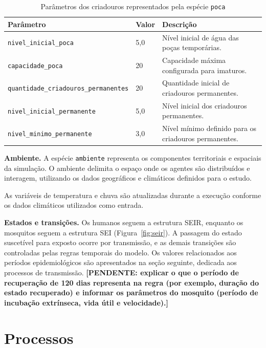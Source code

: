 \begin{table}[htb]
    \centering
    \caption{Parâmetros dos criadouros representados pela espécie \texttt{poca}}
    \label{tab:parametros-poca}
    \begin{tabular}{p{4.2cm} p{2.5cm} p{6.0cm}}
        \hline
        \textbf{Parâmetro} & \textbf{Valor} & \textbf{Descrição} \\
        \hline
        \texttt{nivel\_inicial\_poca} & 5,0 & Nível inicial de água das poças temporárias. \\
        \texttt{capacidade\_poca} & 20 & Capacidade máxima configurada para imaturos. \\
        \texttt{quantidade\_criadouros\_permanentes} & 20 & Quantidade inicial de criadouros permanentes. \\
        \texttt{nivel\_inicial\_permanente} & 5,0 & Nível inicial dos criadouros permanentes. \\
        \texttt{nivel\_minimo\_permanente} & 3,0 & Nível mínimo definido para os criadouros permanentes. \\
        \hline
    \end{tabular}
\end{table}

\textbf{Ambiente.} A espécie \texttt{ambiente} representa os componentes territoriais e espaciais da simulação. O ambiente delimita o espaço onde os agentes são distribuídos e interagem, utilizando os dados geográficos e climáticos definidos para o estudo.

As variáveis de temperatura e chuva são atualizadas durante a execução conforme os dados climáticos utilizados como entrada.

\textbf{Estados e transições.} Os humanos seguem a estrutura SEIR, enquanto os mosquitos seguem a estrutura SEI (Figura~\ref{fig:seir}). A passagem do estado suscetível para exposto ocorre por transmissão, e as demais transições são controladas pelas regras temporais do modelo. Os valores relacionados aos períodos epidemiológicos são apresentados na seção seguinte, dedicada aos processos de transmissão.
\textbf{[PENDENTE: explicar o que o período de recuperação de 120 dias representa na regra (por exemplo, duração do estado recuperado) e informar os parâmetros do mosquito (período de incubação extrínseca, vida útil e velocidade).]}

\section{Processos}

